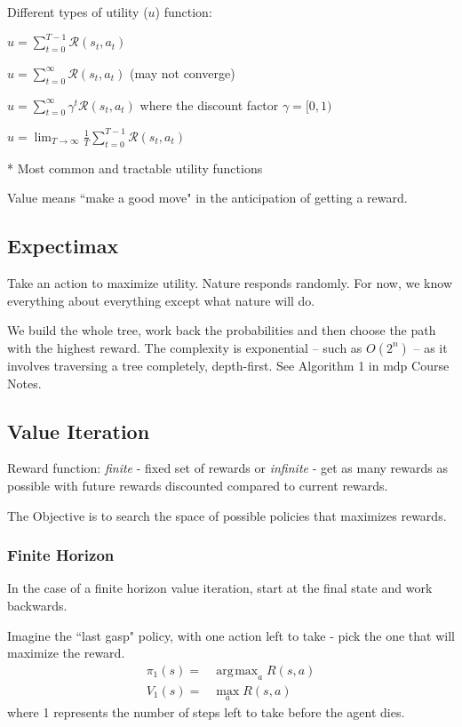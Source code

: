 \documentclass[11pt, oneside]{article}   	%
\DeclareMathOperator*{\argmax}{\arg\!\max}
\begin{document}
Different types of utility ($u$) function:
\begin{description} \itemsep5pt
	\item[Finite Horizon*]	$u = \sum_{t=0}^{T-1}\mathcal{R}(s_t, a_t)$
	\item[Total Reward]$u = \sum_{t=0}^\infty\mathcal{R}(s_t,a_t)$ (may not converge)
	\item[Total Discounted Reward*]$u = \sum_{t=0}^\infty\gamma^t\mathcal{R}(s_t,a_t)$ where the discount factor $\gamma = [0,1)$
	\item[Long-run Average Reward]$u= \lim_{T\rightarrow\infty}\frac{1}{T}\sum_{t=0}^{T-1}\mathcal{R}(s_t,a_t)$
\end{description}

* Most common and tractable utility functions

Value means ``make a good move" in the anticipation of getting a reward.

\subsection{Expectimax}

Take an action to maximize utility. Nature responds randomly. For now, we know everything about everything except what nature will do.

We build the whole tree, work back the probabilities and then choose the path with the highest reward. The complexity is exponential -- such as $O(2^n)$ -- as it involves traversing a tree completely, depth-first. See Algorithm 1 in mdp Course Notes.

\subsection{Value Iteration}
Reward function: \emph{finite} - fixed set of rewards or \emph{infinite} - get as many rewards as possible with future rewards discounted compared to current rewards.

The Objective is to search the space of possible policies that maximizes rewards.

\subsubsection{Finite Horizon}

In the case of a finite horizon value iteration, start at the final state and work backwards.

Imagine the ``last gasp" policy, with one action left to take - pick the one that will maximize the reward.
\begin{align}
\pi_1(s) = &\argmax_a R(s,a)\\
V_1(s) = & \max_a R(s,a)
\end{align}
where 1 represents the number of steps left to take before the agent dies.
\end{document}
